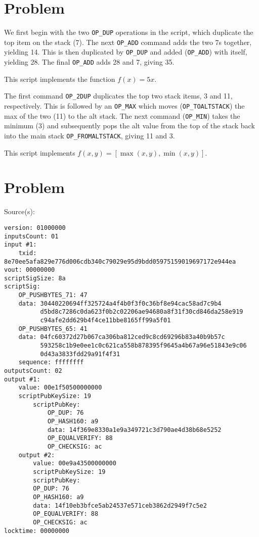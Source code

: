 \documentclass[11pt]{article}
\begin{document}
\section{Problem}

\begin{p}\end{p}
We first begin with the two \texttt{OP\_DUP} operations in the script, which duplicate the top item on the stack (7). The next \texttt{OP\_ADD} command adds the two 7s together, yielding 14. This is then duplicated by \texttt{OP\_DUP} and added (\texttt{OP\_ADD}) with itself, yielding 28. The final \texttt{OP\_ADD} adds 28 and 7, giving 35.

This script implements the function $f(x) = 5x$.

\begin{p}\end{p}
The first command \texttt{OP\_2DUP} duplicates the top two stack items, 3 and 11, respectively. This is followed by an \texttt{OP\_MAX} which moves (\texttt{OP\_TOALTSTACK}) the max of the two (11) to the alt stack. The next command (\texttt{OP\_MIN}) takes the minimum (3) and subsequently pops the alt value from the top of the stack back into the main stack \texttt{OP\_FROMALTSTACK}, giving 11 and 3.

This script implements $f(x, y) = [\max(x, y), \min(x, y)]$.

\section{Problem}

Source(s): \cite{githubBitcoinTransactions}

\begin{verbatim}
version: 01000000
inputsCount: 01
input #1:
    txid: 8e70ee5afa829e776d006cdb340c79029e95d9bdd05975159019697172e944ea
vout: 00000000
scriptSigSize: 8a
scriptSig:
    OP_PUSHBYTES_71: 47
    data: 30440220694ff325724a4f4b0f3f0c36bf8e94cac58ad7c9b4
          d5bd8c7286c0da623f0b2c02206ae94680a8f31f30cd846da258e919
          c94afe2dd629b4f4ce11bbe8165ff99a5f01
    OP_PUSHBYTES_65: 41
    data: 04fc60372d27b067ca306ba812ced9c8cd69296b83a40b9b57c
          593258c1b9e0ee1c0c621ca558b878395f9645a4b67a96e51843e9c06
          0d43a3833fdd29a91f4f31
    sequence: ffffffff
outputsCount: 02
output #1:
    value: 00e1f50500000000
    scriptPubKeySize: 19
        scriptPubKey:
            OP_DUP: 76
            OP_HASH160: a9
            data: 14f369e8330a1e9a349721c3d790ae4d38b68e5252
            OP_EQUALVERIFY: 88
            OP_CHECKSIG: ac
    output #2:
        value: 00e9a43500000000
        scriptPubKeySize: 19
        scriptPubKey:
        OP_DUP: 76
        OP_HASH160: a9
        data: 14f10eb3bfce5ab24537e571ceb3862d2949f7c5e2
        OP_EQUALVERIFY: 88
        OP_CHECKSIG: ac
locktime: 00000000
\end{verbatim}
\end{document}
